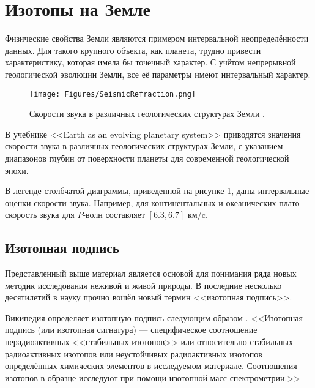 \documentclass[a5paper,openany]{book}
\begin{document}
\section{Изотопы на Земле}

Физические свойства Земли являются примером интервальной неопределённости данных. Для такого крупного объекта, как планета, трудно привести характеристику, которая имела бы точечный характер. С учётом непрерывной геологической эволюции Земли, все её параметры имеют интервальный характер. 

\begin{figure}[ht] 
	\centering\small
	\unitlength=1mm
	\texttt{[image: Figures/SeismicRefraction.png]} 
	\caption{Скорости звука в различных геологических структурах Земли \cite{Condie2015}.} 
	\label{f:SeismicRefraction}
\end{figure}

В учебнике <<Earth as an evolving planetary system>> \cite{Condie2015} приводятся значения скорости звука в различных геологических структурах Земли, с указанием диапазонов глубин от поверхности планеты для современной геологической эпохи. 

В легенде столбчатой диаграммы, приведенной на рисунке  \ref{f:SeismicRefraction}, даны интервальные оценки скорости звука.
Например, для континентальных и океанических плато скорость звука для $P$-волн составляет 
$ [6.3, 6.7 ]$ км/c.


\subsection{Изотопная подпись}\label{s:IsotopeSignature}

Представленный выше материал является основой для понимания ряда новых методик исследования неживой и живой природы. 
В последние несколько десятилетий в науку прочно вошёл новый термин <<изотопная подпись>>. 

Википедия определяет изотопную подпись следующим образом \cite{IsotopeSignatureWiki}. 
<<Изотопная подпись  (или изотопная сигнатура) --- специфическое соотношение нерадиоактивных <<стабильных изотопов>> или относительно стабильных радиоактивных изотопов или неустойчивых радиоактивных изотопов определённых химических элементов в исследуемом материале. Соотношения изотопов в образце исследуют при помощи изотопной масс-спектрометрии.>>
\end{document}
